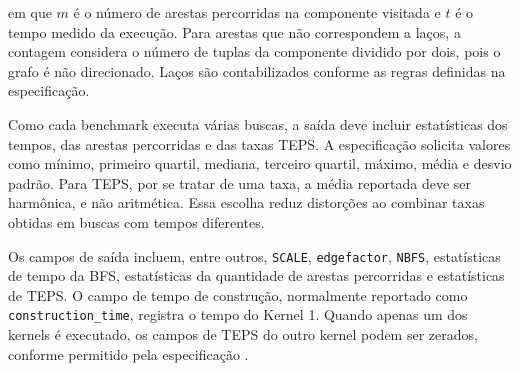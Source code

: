 em que $m$ é o número de arestas percorridas na componente visitada e $t$ é o tempo medido da execução. Para arestas que não correspondem a laços, a contagem considera o número de tuplas da componente dividido por dois, pois o grafo é não direcionado. Laços são contabilizados conforme as regras definidas na especificação.

Como cada benchmark executa várias buscas, a saída deve incluir estatísticas dos tempos, das arestas percorridas e das taxas TEPS. A especificação solicita valores como mínimo, primeiro quartil, mediana, terceiro quartil, máximo, média e desvio padrão. Para TEPS, por se tratar de uma taxa, a média reportada deve ser harmônica, e não aritmética. Essa escolha reduz distorções ao combinar taxas obtidas em buscas com tempos diferentes.

Os campos de saída incluem, entre outros, \texttt{SCALE},
\texttt{edgefactor}, \texttt{NBFS}, estatísticas de tempo da BFS,
estatísticas da quantidade de arestas percorridas e estatísticas de TEPS. O
campo de tempo de construção, normalmente reportado como
\texttt{construction\_time}, registra o tempo do Kernel 1. Quando apenas um dos
kernels é executado, os campos de TEPS do outro kernel podem ser zerados,
conforme permitido pela especificação \cite{graph500spec}.
